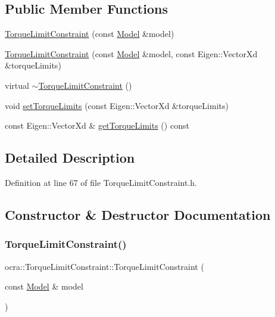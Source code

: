 \subsection*{Public Member Functions}
\begin{DoxyCompactItemize}
\item 
\hyperlink{classocra_1_1TorqueLimitConstraint_ac1d452a8e42d05489ab0b16c9abbba0b}{Torque\+Limit\+Constraint} (const \hyperlink{classocra_1_1Model}{Model} \&model)
\item 
\hyperlink{classocra_1_1TorqueLimitConstraint_adf43adabb40dc149d609b219fe8b7ac0}{Torque\+Limit\+Constraint} (const \hyperlink{classocra_1_1Model}{Model} \&model, const Eigen\+::\+Vector\+Xd \&torque\+Limits)
\item 
virtual \hyperlink{classocra_1_1TorqueLimitConstraint_a893e34cf1ab2a6faf59bf394e769bbe3}{$\sim$\+Torque\+Limit\+Constraint} ()
\item 
void \hyperlink{classocra_1_1TorqueLimitConstraint_aae5d3c15e07731fb19f2f55b45852554}{set\+Torque\+Limits} (const Eigen\+::\+Vector\+Xd \&torque\+Limits)
\item 
const Eigen\+::\+Vector\+Xd \& \hyperlink{classocra_1_1TorqueLimitConstraint_a34f89a0c633bf6a8cabf79f9d6d22871}{get\+Torque\+Limits} () const
\end{DoxyCompactItemize}


\subsection{Detailed Description}


Definition at line 67 of file Torque\+Limit\+Constraint.\+h.



\subsection{Constructor \& Destructor Documentation}
\hypertarget{classocra_1_1TorqueLimitConstraint_ac1d452a8e42d05489ab0b16c9abbba0b}{}\label{classocra_1_1TorqueLimitConstraint_ac1d452a8e42d05489ab0b16c9abbba0b} 
\subsubsection{\texorpdfstring{Torque\+Limit\+Constraint()}{TorqueLimitConstraint()}\hspace{0.1cm}{\footnotesize\ttfamily [1/2]}}
{\footnotesize\ttfamily ocra\+::\+Torque\+Limit\+Constraint\+::\+Torque\+Limit\+Constraint (\begin{DoxyParamCaption}\item[{const \hyperlink{classocra_1_1Model}{Model} \&}]{model }\end{DoxyParamCaption})\hspace{0.3cm}{\ttfamily [inline]}}



